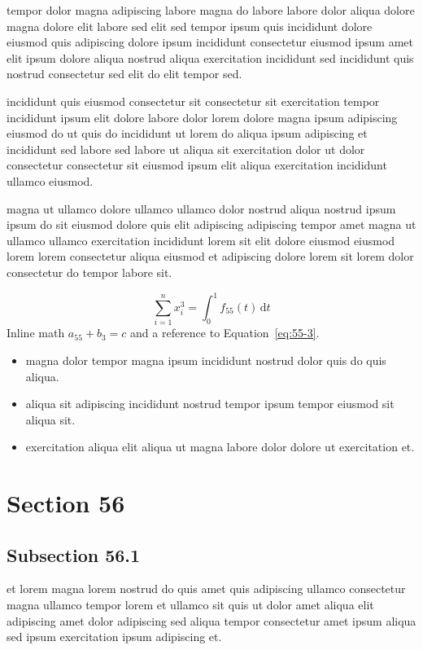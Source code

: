 \documentclass{article}
\begin{document}
tempor dolor magna adipiscing labore magna do labore labore dolor aliqua dolore magna dolore elit labore sed elit sed tempor ipsum quis incididunt dolore eiusmod quis adipiscing dolore ipsum incididunt consectetur eiusmod ipsum amet elit ipsum dolore aliqua nostrud aliqua exercitation incididunt sed incididunt quis nostrud consectetur sed elit do elit tempor sed.

incididunt quis eiusmod consectetur sit consectetur sit exercitation tempor incididunt ipsum elit dolore labore dolor lorem dolore magna ipsum adipiscing eiusmod do ut quis do incididunt ut lorem do aliqua ipsum adipiscing et incididunt sed labore sed labore ut aliqua sit exercitation dolor ut dolor consectetur consectetur sit eiusmod ipsum elit aliqua exercitation incididunt ullamco eiusmod.

magna ut ullamco dolore ullamco ullamco dolor nostrud aliqua nostrud ipsum ipsum do sit eiusmod dolore quis elit adipiscing adipiscing tempor amet magna ut ullamco ullamco exercitation incididunt lorem sit elit dolore eiusmod eiusmod lorem lorem consectetur aliqua eiusmod et adipiscing dolore lorem sit lorem dolor consectetur do tempor labore sit.

\begin{equation}\label{eq:55-3}
  \sum_{i=1}^{n} x_i^{3} = \int_0^1 f_{55}(t)\,\mathrm{d}t
\end{equation}
Inline math $a_{55} + b_{3} = c$ and a reference to Equation~\eqref{eq:55-3}.

\begin{itemize}
  \item magna dolor tempor magna ipsum incididunt nostrud dolor quis do quis aliqua.
  \item aliqua sit adipiscing incididunt nostrud tempor ipsum tempor eiusmod sit aliqua sit.
  \item exercitation aliqua elit aliqua ut magna labore dolor dolore ut exercitation et.
\end{itemize}

\section{Section 56}\label{sec:56}
\subsection{Subsection 56.1}\label{sec:56-1}
et lorem magna lorem nostrud do quis amet quis adipiscing ullamco consectetur magna ullamco tempor lorem et ullamco sit quis ut dolor amet aliqua elit adipiscing amet dolor adipiscing sed aliqua tempor consectetur amet ipsum aliqua sed ipsum exercitation ipsum adipiscing et.
\end{document}
